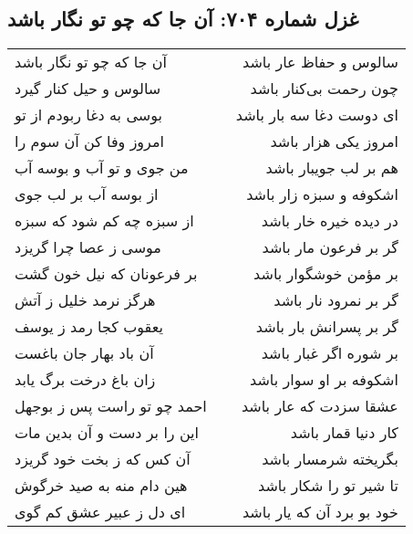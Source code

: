 \begin{center}
\section*{غزل شماره ۷۰۴: آن جا که چو تو نگار باشد}
\label{sec:0704}
\begin{longtable}{l p{0.5cm} r}
آن جا که چو تو نگار باشد
&&
سالوس و حفاظ عار باشد
\\
سالوس و حیل کنار گیرد
&&
چون رحمت بی‌کنار باشد
\\
بوسی به دغا ربودم از تو
&&
ای دوست دغا سه بار باشد
\\
امروز وفا کن آن سوم را
&&
امروز یکی هزار باشد
\\
من جوی و تو آب و بوسه آب
&&
هم بر لب جویبار باشد
\\
از بوسه آب بر لب جوی
&&
اشکوفه و سبزه زار باشد
\\
از سبزه چه کم شود که سبزه
&&
در دیده خیره خار باشد
\\
موسی ز عصا چرا گریزد
&&
گر بر فرعون مار باشد
\\
بر فرعونان که نیل خون گشت
&&
بر مؤمن خوشگوار باشد
\\
هرگز نرمد خلیل ز آتش
&&
گر بر نمرود نار باشد
\\
یعقوب کجا رمد ز یوسف
&&
گر بر پسرانش بار باشد
\\
آن باد بهار جان باغست
&&
بر شوره اگر غبار باشد
\\
زان باغ درخت برگ یابد
&&
اشکوفه بر او سوار باشد
\\
احمد چو تو راست پس ز بوجهل
&&
عشقا سزدت که عار باشد
\\
این را بر دست و آن بدین مات
&&
کار دنیا قمار باشد
\\
آن کس که ز بخت خود گریزد
&&
بگریخته شرمسار باشد
\\
هین دام منه به صید خرگوش
&&
تا شیر تو را شکار باشد
\\
ای دل ز عبیر عشق کم گوی
&&
خود بو برد آن که یار باشد
\\
\end{longtable}
\end{center}
